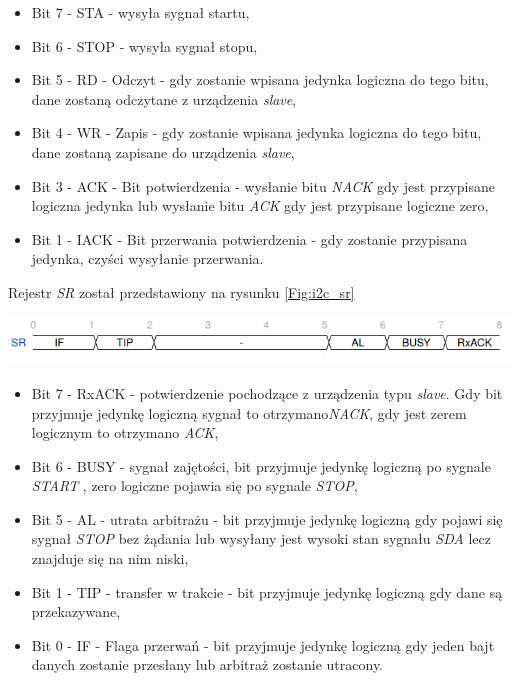 \documentclass[11pt,a4paper]{article}
\begin{document}
\begin{itemize}
	\item Bit 7 - STA - wysyła sygnał startu,
	\item Bit 6 - STOP - wysyła sygnał stopu,
	\item Bit 5 - RD - Odczyt - gdy zostanie wpisana jedynka logiczna do tego bitu, dane zostaną odczytane z urządzenia \textit{slave},
	\item Bit 4 - WR - Zapis - gdy zostanie wpisana jedynka logiczna do tego bitu, dane zostaną zapisane do urządzenia \textit{slave},
	\item Bit 3 - ACK - Bit potwierdzenia - wysłanie bitu \textit{NACK} gdy jest przypisane logiczna jedynka lub wysłanie bitu \textit{ACK} gdy jest przypisane logiczne zero,
	\item Bit 1 - IACK - Bit przerwania potwierdzenia - gdy zostanie przypisana jedynka, czyści wysyłanie przerwania.
\end{itemize}
Rejestr \textit{SR} został przedstawiony na rysunku \ref{Fig:i2c_sr}\\
	\begin{minipage}[c]{\textwidth}

					\includegraphics[width=\textwidth]{./rysunki/sr_i2c.png}
	\end{minipage} 
	\begin{itemize}
		\item Bit 7 - RxACK - potwierdzenie pochodzące z urządzenia typu \textit{slave}. Gdy bit przyjmuje jedynkę logiczną sygnał to otrzymano\textit{NACK}, gdy jest zerem logicznym to otrzymano \textit{ACK},
		\item Bit 6 - BUSY - sygnał zajętości, bit przyjmuje jedynkę logiczną po sygnale \textit{START} , zero logiczne pojawia się po sygnale \textit{STOP},
		\item Bit 5 - AL - utrata arbitrażu - bit  przyjmuje jedynkę logiczną gdy pojawi się sygnał \textit{STOP} bez żądania lub wysyłany jest wysoki stan sygnału \textit{SDA} lecz znajduje się na nim niski,
		\item Bit 1 - TIP - transfer w trakcie - bit przyjmuje jedynkę logiczną gdy dane są przekazywane,
		\item Bit 0 - IF - Flaga przerwań - bit przyjmuje jedynkę logiczną gdy jeden bajt danych zostanie przesłany lub arbitraż zostanie utracony.
	\end{itemize}
\end{document}

